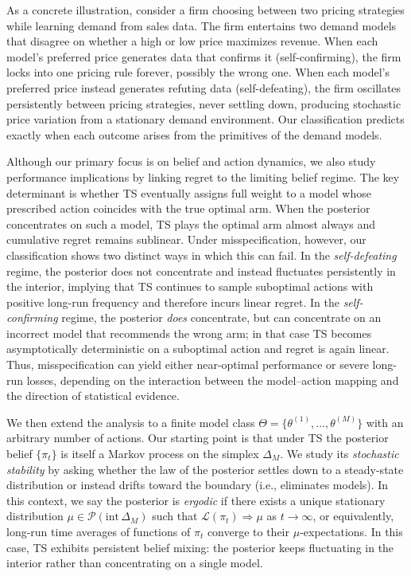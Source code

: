 \documentclass[12pt]{article}
\begin{document}
As a concrete illustration, consider a firm choosing between two pricing strategies while learning demand from sales data. The firm entertains two demand models that disagree on whether a high or low price maximizes revenue. When each model's preferred price generates data that confirms it (self-confirming), the firm locks into one pricing rule forever, possibly the wrong one. When each model's preferred price instead generates refuting data (self-defeating), the firm oscillates persistently between pricing strategies, never settling down, producing stochastic price variation from a stationary demand environment. Our classification predicts exactly when each outcome arises from the primitives of the demand models.

Although our primary focus is on belief and action dynamics, we also study performance implications by linking regret to the limiting belief regime. The key determinant is whether TS eventually assigns full weight to a model whose prescribed action coincides with the true optimal arm. When the posterior concentrates on such a model, TS plays the optimal arm almost always and cumulative regret remains sublinear. Under misspecification, however, our classification shows two distinct ways in which this can fail. In the \emph{self-defeating} regime, the posterior does not concentrate and instead fluctuates persistently in the interior, implying that TS continues to sample suboptimal actions with positive long-run frequency and therefore incurs linear regret. In the \emph{self-confirming} regime, the posterior \emph{does} concentrate, but can concentrate on an incorrect model that recommends the wrong arm; in that case TS becomes asymptotically deterministic on a suboptimal action and regret is again linear. Thus, misspecification can yield either near-optimal performance or severe long-run losses, depending on the interaction between the model--action mapping and the direction of statistical evidence.

We then extend the analysis to a finite model class $\Theta=\{\theta^{(1)},\ldots,\theta^{(M)}\}$ with an arbitrary number of actions. Our starting point is that under TS the posterior belief $\{\pi_t\}$ is itself a Markov process on the simplex $\Delta_M$. We study its \emph{stochastic stability} by asking whether the law of the posterior settles down to a steady-state distribution or instead drifts toward the boundary (i.e., eliminates models). In this context, we say the posterior is \emph{ergodic} if there exists a unique stationary distribution $\mu\in\mathcal P(\mathrm{int}\,\Delta_M)$ such that $\mathcal L(\pi_t)\Rightarrow \mu$ as $t\to\infty$, or equivalently, long-run time averages of functions of $\pi_t$ converge to their $\mu$-expectations. In this case, TS exhibits persistent belief mixing: the posterior keeps fluctuating in the interior rather than concentrating on a single model.
\end{document}

